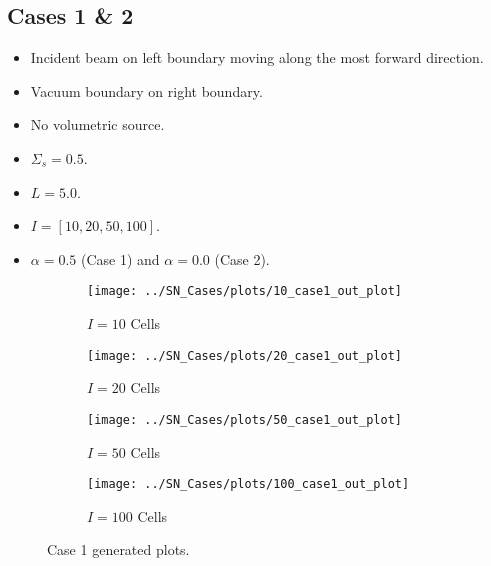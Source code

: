 \documentclass{NE515}
\theoremstyle{definition}
\begin{document}
    \subsection{Cases 1 \& 2}
    \begin{itemize}
        \item Incident beam on left boundary moving along the most forward direction.
        \item Vacuum boundary on right boundary.
        \item No volumetric source.
        \item $\Sigma_s=0.5$.
        \item $L=5.0$.
        \item $I=[10,20,50,100]$.
        \item $\alpha=0.5$ (Case 1) and $\alpha=0.0$ (Case 2).
    \end{itemize}
    \begin{figure}
        \centering
        \begin{subfigure}{0.45\linewidth}
            \centering
            \texttt{[image: ../SN\_Cases/plots/10\_case1\_out\_plot]}
            \caption{$I=10$ Cells}
        \end{subfigure}
        \hfill
        \begin{subfigure}{0.45\linewidth}
            \centering
            \texttt{[image: ../SN\_Cases/plots/20\_case1\_out\_plot]}
            \caption{$I=20$ Cells}
        \end{subfigure}
        \hfill
        \begin{subfigure}{0.45\linewidth}
            \centering
            \texttt{[image: ../SN\_Cases/plots/50\_case1\_out\_plot]}
            \caption{$I=50$ Cells}
        \end{subfigure}
        \hfill
        \begin{subfigure}{0.45\linewidth}
            \centering
            \texttt{[image: ../SN\_Cases/plots/100\_case1\_out\_plot]}
            \caption{$I=100$ Cells}
        \end{subfigure}

        \caption{Case 1 generated plots.}
        \label{fig:case-1}
    \end{figure}
\end{document}
